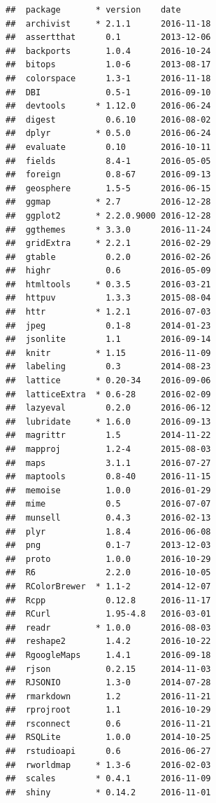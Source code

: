 \documentclass[nojss]{jss}\usepackage[]{graphicx}\usepackage[]{color}
\makeatletter
\newenvironment{kframe}{%
 \def\at@end@of@kframe{}%
 \ifinner\ifhmode%
  \def\at@end@of@kframe{\end{minipage}}%
  \begin{minipage}{\columnwidth}%
 \fi\fi%
 \def\FrameCommand##1{\hskip\@totalleftmargin \hskip-\fboxsep
 \colorbox{shadecolor}{##1}\hskip-\fboxsep
     \hskip-\linewidth \hskip-\@totalleftmargin \hskip\columnwidth}%
 \MakeFramed {\advance\hsize-\width
   \@totalleftmargin\z@ \linewidth\hsize
   \@setminipage}}%
 {\par\unskip\endMakeFramed%
 \at@end@of@kframe}
\newenvironment{knitrout}{}{} %
\makeatother
\begin{document}
\begin{knitrout}
\begin{kframe}
{\ttfamily\noindent\itshape\color{messagecolor}{\#\# Packages -------------------------------------------------------------}}\begin{verbatim}
##  package       * version    date      
##  archivist     * 2.1.1      2016-11-18
##  assertthat      0.1        2013-12-06
##  backports       1.0.4      2016-10-24
##  bitops          1.0-6      2013-08-17
##  colorspace      1.3-1      2016-11-18
##  DBI             0.5-1      2016-09-10
##  devtools      * 1.12.0     2016-06-24
##  digest          0.6.10     2016-08-02
##  dplyr         * 0.5.0      2016-06-24
##  evaluate        0.10       2016-10-11
##  fields          8.4-1      2016-05-05
##  foreign         0.8-67     2016-09-13
##  geosphere       1.5-5      2016-06-15
##  ggmap         * 2.7        2016-12-28
##  ggplot2       * 2.2.0.9000 2016-12-28
##  ggthemes      * 3.3.0      2016-11-24
##  gridExtra     * 2.2.1      2016-02-29
##  gtable          0.2.0      2016-02-26
##  highr           0.6        2016-05-09
##  htmltools     * 0.3.5      2016-03-21
##  httpuv          1.3.3      2015-08-04
##  httr          * 1.2.1      2016-07-03
##  jpeg            0.1-8      2014-01-23
##  jsonlite        1.1        2016-09-14
##  knitr         * 1.15       2016-11-09
##  labeling        0.3        2014-08-23
##  lattice       * 0.20-34    2016-09-06
##  latticeExtra  * 0.6-28     2016-02-09
##  lazyeval        0.2.0      2016-06-12
##  lubridate     * 1.6.0      2016-09-13
##  magrittr        1.5        2014-11-22
##  mapproj         1.2-4      2015-08-03
##  maps            3.1.1      2016-07-27
##  maptools        0.8-40     2016-11-15
##  memoise         1.0.0      2016-01-29
##  mime            0.5        2016-07-07
##  munsell         0.4.3      2016-02-13
##  plyr            1.8.4      2016-06-08
##  png             0.1-7      2013-12-03
##  proto           1.0.0      2016-10-29
##  R6              2.2.0      2016-10-05
##  RColorBrewer  * 1.1-2      2014-12-07
##  Rcpp            0.12.8     2016-11-17
##  RCurl           1.95-4.8   2016-03-01
##  readr         * 1.0.0      2016-08-03
##  reshape2        1.4.2      2016-10-22
##  RgoogleMaps     1.4.1      2016-09-18
##  rjson           0.2.15     2014-11-03
##  RJSONIO         1.3-0      2014-07-28
##  rmarkdown       1.2        2016-11-21
##  rprojroot       1.1        2016-10-29
##  rsconnect       0.6        2016-11-21
##  RSQLite         1.0.0      2014-10-25
##  rstudioapi      0.6        2016-06-27
##  rworldmap     * 1.3-6      2016-02-03
##  scales        * 0.4.1      2016-11-09
##  shiny         * 0.14.2     2016-11-01

\end{verbatim}
\end{kframe}
\end{knitrout}
\end{document}
